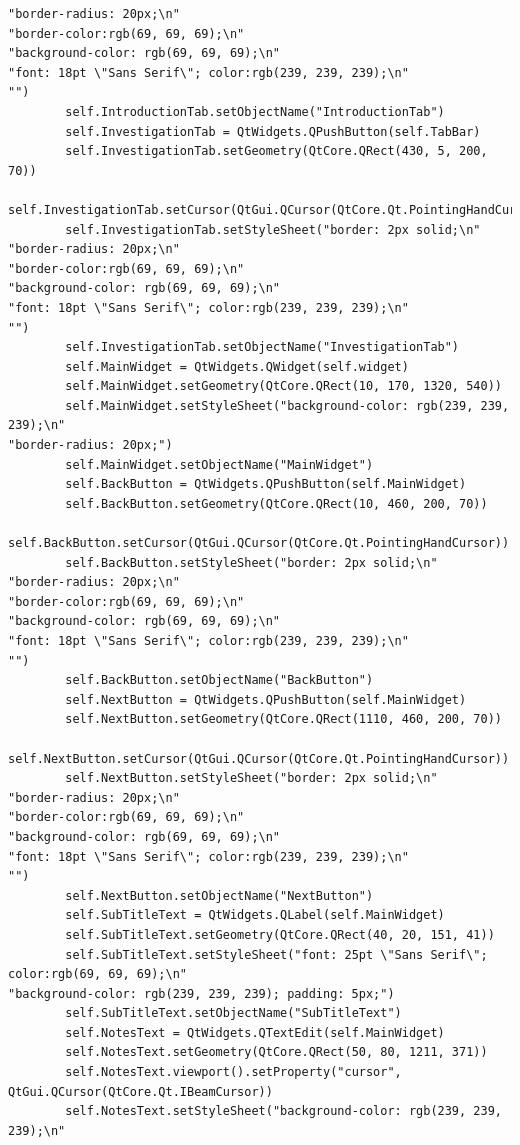 \documentclass{article}
\begin{document}
\begin{lstlisting}
"border-radius: 20px;\n"
"border-color:rgb(69, 69, 69);\n"
"background-color: rgb(69, 69, 69);\n"
"font: 18pt \"Sans Serif\"; color:rgb(239, 239, 239);\n"
"")
        self.IntroductionTab.setObjectName("IntroductionTab")
        self.InvestigationTab = QtWidgets.QPushButton(self.TabBar)
        self.InvestigationTab.setGeometry(QtCore.QRect(430, 5, 200, 70))
        self.InvestigationTab.setCursor(QtGui.QCursor(QtCore.Qt.PointingHandCursor))
        self.InvestigationTab.setStyleSheet("border: 2px solid;\n"
"border-radius: 20px;\n"
"border-color:rgb(69, 69, 69);\n"
"background-color: rgb(69, 69, 69);\n"
"font: 18pt \"Sans Serif\"; color:rgb(239, 239, 239);\n"
"")
        self.InvestigationTab.setObjectName("InvestigationTab")
        self.MainWidget = QtWidgets.QWidget(self.widget)
        self.MainWidget.setGeometry(QtCore.QRect(10, 170, 1320, 540))
        self.MainWidget.setStyleSheet("background-color: rgb(239, 239, 239);\n"
"border-radius: 20px;")
        self.MainWidget.setObjectName("MainWidget")
        self.BackButton = QtWidgets.QPushButton(self.MainWidget)
        self.BackButton.setGeometry(QtCore.QRect(10, 460, 200, 70))
        self.BackButton.setCursor(QtGui.QCursor(QtCore.Qt.PointingHandCursor))
        self.BackButton.setStyleSheet("border: 2px solid;\n"
"border-radius: 20px;\n"
"border-color:rgb(69, 69, 69);\n"
"background-color: rgb(69, 69, 69);\n"
"font: 18pt \"Sans Serif\"; color:rgb(239, 239, 239);\n"
"")
        self.BackButton.setObjectName("BackButton")
        self.NextButton = QtWidgets.QPushButton(self.MainWidget)
        self.NextButton.setGeometry(QtCore.QRect(1110, 460, 200, 70))
        self.NextButton.setCursor(QtGui.QCursor(QtCore.Qt.PointingHandCursor))
        self.NextButton.setStyleSheet("border: 2px solid;\n"
"border-radius: 20px;\n"
"border-color:rgb(69, 69, 69);\n"
"background-color: rgb(69, 69, 69);\n"
"font: 18pt \"Sans Serif\"; color:rgb(239, 239, 239);\n"
"")
        self.NextButton.setObjectName("NextButton")
        self.SubTitleText = QtWidgets.QLabel(self.MainWidget)
        self.SubTitleText.setGeometry(QtCore.QRect(40, 20, 151, 41))
        self.SubTitleText.setStyleSheet("font: 25pt \"Sans Serif\"; color:rgb(69, 69, 69);\n"
"background-color: rgb(239, 239, 239); padding: 5px;")
        self.SubTitleText.setObjectName("SubTitleText")
        self.NotesText = QtWidgets.QTextEdit(self.MainWidget)
        self.NotesText.setGeometry(QtCore.QRect(50, 80, 1211, 371))
        self.NotesText.viewport().setProperty("cursor", QtGui.QCursor(QtCore.Qt.IBeamCursor))
        self.NotesText.setStyleSheet("background-color: rgb(239, 239, 239);\n"

\end{lstlisting}
\end{document}
